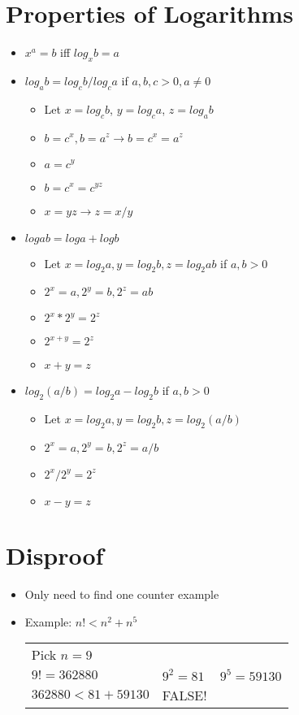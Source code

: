 \documentclass[12pt]{article}
\begin{document}
\section*{Properties of Logarithms}
\begin{itemize}

    \item $x^a = b$ iff $log_x b = a$

    \item $log_a b = log_c b / log_c a$ if $a, b, c > 0, a \neq 0$
    \begin{itemize}
        \item Let $x = log_c b$, $y = log_c a$, $z = log_a b$
        \item $b = c^x, b=a^z \rightarrow b = c^x = a^z$
        \item $a = c^y$
        \item $b = c^x = c^{yz}$
        \item $x = yz \rightarrow z = x/y$
    \end{itemize}

    \item $logab = loga + logb$
    \begin{itemize}
        \item Let $x = log_2 a, y = log_2 b, z = log_2 ab$ if $a, b > 0$
        \item $2^x = a, 2^y = b, 2^z = ab$
        \item $2^x * 2^y = 2^z$
        \item $2^{x+y} = 2^z$
        \item $x + y = z$
    \end{itemize}

    \item $log_2 (a/b) = log_2 a - log_2 b$ if $a, b > 0$
    \begin{itemize}
        \item Let $x = log_2 a, y = log_2 b, z = log_2 (a/b)$
        \item $2^x = a, 2^y = b, 2^z = a / b$
        \item $2^x / 2^y = 2^z$
        \item $x-y = z$
    \end{itemize}

\end{itemize}

\pagebreak

\section*{Disproof}
\begin{itemize}
    \item Only need to find one counter example
    \item Example: $n! < n^2 + n^5$ \\
    \begin{tabular}{l l l}
        Pick $n=9$ & & \\
        $9! = 362880$ & $9^2 = 81$ & $9^5 = 59130$ \\
        $362880 < 81 + 59130$ & FALSE! &
    \end{tabular}
\end{itemize}
\end{document}
